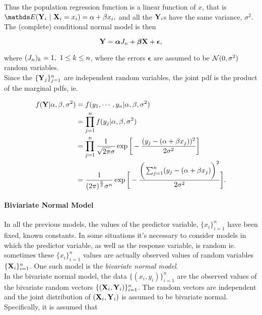 \documentclass{homework}
\begin{document}
Thus the population regression function is a linear function of $x$, that is $\E ({\bf Y}_i\blank|\blank{\bf X}_i = x_i) = \alpha + \beta x_i, $ and all the ${\bf Y}_i$s have the same variance, $\sigma^2$. The (complete) conditional normal model is then

\begin{equation}
    {\bf Y} = \bm \alpha J_n + \bm \beta {\bf X} + \bm \epsilon,
    \label{conditional normal model}
\end{equation}

where $(J_n)_k = 1, \textnormal{ } 1 \leq k \leq n$, where the errors ${\bm \epsilon}$ are assumed to be $\mathcal{N}(0,\sigma^2)$ random variables. \\

Since the $\{{\bf Y}_j\}_{j=1}^{n}$ are independent random variables, the joint pdf is the product of the marginal pdfs, ie.

\begin{align}
    f({\bf Y} | \alpha, \beta, \sigma^2) &= f(y_1, \cdots, y_n | \alpha, \beta, \sigma^2) \\
    &= \prod_{j=1}^{n} f(y_j | \alpha, \beta, \sigma^2) \\
    &= \prod_{j=1}^{n} \frac{1}{\sqrt{2\pi}\sigma} \exp\bigg[-\frac{(y_j -(\alpha + \beta x_j))^2}{2\sigma^2}\bigg] \\
    &=  \frac{1}{{(2\pi)}^{\frac{n}{2}}\sigma^{n}} \exp\bigg[-\frac{\bigg(\sum_{j=1}^{n}(y_j -(\alpha + \beta x_j)\bigg)^2}{2\sigma^2}\bigg]. \\
    \label{conditional normal pdf}
\end{align}

\paragraph{\textbf{Biviariate Normal Model}} 

In all the previous models, the values of the predictor variable, $\{x_i\}_{i=1}^n$ have been fixed, known constants. In some situations it's necessary to consider models in which the predictor variable, as well as the response variable, is random ie. sometimes these $\{x_i\}_{i=1}^n$ values are actually observed values of random variables $\{{\bf X}_i\}_{i=1}^n$. One such model is the \textit{bivariate normal model}. \\

In the bivariate normal model, the data $\{(x_i, y_i)\}_{i=1}^n$ are the observed values of the bivariate random vectors $\{({\bf X}_i, {\bf Y}_i)\}_{i=1}^n$. The random vectors are independent and the joint distribution of $({\bf X}_i, {\bf Y}_i)$ is assumed to be bivariate normal. Specifically, it is assumed that 
\end{document}
